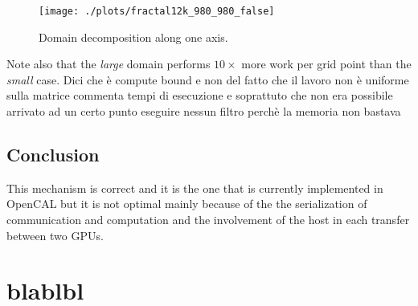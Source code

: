   \begin{figure}
	\begin{center}
		\texttt{[image: ./plots/fractal12k\_980\_980\_false]}
		\caption{Domain decomposition along one axis.}
		\label{fig:fractal12k_980_980_false}
	\end{center}
\end{figure}






Note also that the \textit{large} domain performs $10 \times$ more work per grid point than the \textit{small} case. 
Dici che è compute bound e non del fatto che il lavoro non è uniforme sulla matrice 
commenta tempi di esecuzione e soprattuto che non era possibile arrivato ad un certo punto eseguire nessun filtro perchè la memoria non bastava


\subsection{Conclusion}
This mechanism is correct and it is the one that is currently implemented in OpenCAL but it is not optimal mainly because of the the serialization of communication and computation and the involvement of the host in each transfer between two GPUs.





\section{blablbl}